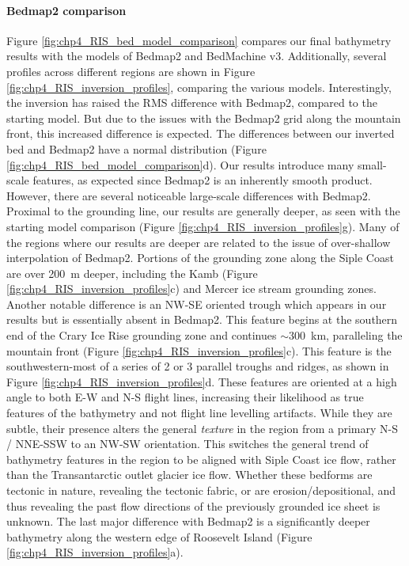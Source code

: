 \paragraph*{Bedmap2 comparison}

Figure \ref{fig:chp4_RIS_bed_model_comparison} compares our final bathymetry results with the models of Bedmap2 and BedMachine v3. Additionally, several profiles across different regions are shown in Figure \ref{fig:chp4_RIS_inversion_profiles}, comparing the various models. Interestingly, the inversion has raised the RMS difference with Bedmap2, compared to the starting model. But due to the issues with the Bedmap2 grid along the mountain front, this increased difference is expected. The differences between our inverted bed and Bedmap2 have a normal distribution (Figure \ref{fig:chp4_RIS_bed_model_comparison}d). Our results introduce many small-scale features, as expected since Bedmap2 is an inherently smooth product. However, there are several noticeable large-scale differences with Bedmap2. Proximal to the grounding line, our results are generally deeper, as seen with the starting model comparison (Figure \ref{fig:chp4_RIS_inversion_profiles}g). Many of the regions where our results are deeper are related to the issue of over-shallow interpolation of Bedmap2. Portions of the grounding zone along the Siple Coast are over 200~m deeper, including the Kamb (Figure \ref{fig:chp4_RIS_inversion_profiles}c) and Mercer ice stream grounding zones. \\

Another notable difference is an NW-SE oriented trough which appears in our results but is essentially absent in Bedmap2. This feature begins at the southern end of the Crary Ice Rise grounding zone and continues $\sim300$~km, paralleling the mountain front (Figure \ref{fig:chp4_RIS_inversion_profiles}c). This feature is the southwestern-most of a series of 2 or 3 parallel troughs and ridges, as shown in Figure \ref{fig:chp4_RIS_inversion_profiles}d. These features are oriented at a high angle to both E-W and N-S flight lines, increasing their likelihood as true features of the bathymetry and not flight line levelling artifacts. While they are subtle, their presence alters the general \textit{texture} in the region from a primary N-S / NNE-SSW to an NW-SW orientation. This switches the general trend of bathymetry features in the region to be aligned with Siple Coast ice flow, rather than the Transantarctic outlet glacier ice flow. Whether these bedforms are tectonic in nature, revealing the tectonic fabric, or are erosion/depositional, and thus revealing the past flow directions of the previously grounded ice sheet is unknown. The last major difference with Bedmap2 is a significantly deeper bathymetry along the western edge of Roosevelt Island (Figure \ref{fig:chp4_RIS_inversion_profiles}a).\\


